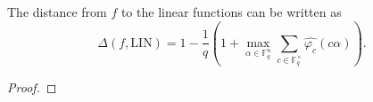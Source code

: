 \begin{theorem}
\label{lem:distance-to-linearity-via-fourier-sets}
\leanok
The distance from $f$ to the linear functions can be written as
  \[
    \Delta(f,\mathrm{LIN})
    = 1 - \frac{1}{q}\left(1 + \max_{\alpha \in \mathbb{F}_q^n}
      \sum_{c \in \mathbb{F}_q^\times} \widehat{\varphi_c}(c\alpha)\right).
  \]
\end{theorem}
\begin{proof}
\end{proof}
